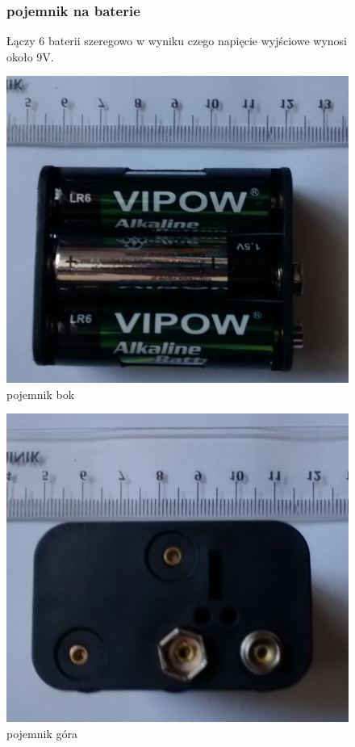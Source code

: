 \documentclass[a4paper,11pt]{article}
\def\SCALE{0.6}
\begin{document}
\begin{figure}[H]
	\subsubsection{pojemnik na baterie}
	Łączy 6 baterii szeregowo w wyniku czego napięcie wyjściowe wynosi około 9V.


	\centering
	\includegraphics[width=\SCALE
	\paperwidth]{pojemnik-1}
	\caption{pojemnik bok}
	

	
\end{figure}
	\begin{figure}[H]
		\centering
		\includegraphics[width=\SCALE
		\paperwidth]{pojemnik-2}
		\caption{pojemnik góra}
	\end{figure}	
\end{document}
